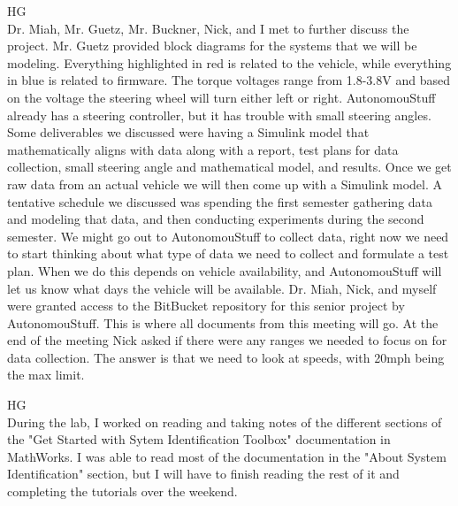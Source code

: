 \documentclass[fontsize=11pt, %
                             paper=letter, %
                             openany, %
                             captions=tableheading,
                             index=totoc,
                             hyperref]{labbook}
\def\currentYear{2021}
\begin{document}
\begin{addmargin}[0cm]{0cm}
\labday{Thursday, September 23, \currentYear}
HG\\

Dr. Miah, Mr. Guetz, Mr. Buckner, Nick, and I met to further discuss the project. Mr. Guetz provided block diagrams for the systems that we will be modeling. Everything highlighted in red is related to the vehicle, while everything in blue is related to firmware. The torque voltages range from 1.8-3.8V and based on the voltage the steering wheel will turn either left or right. AutonomouStuff already has a steering controller, but it has trouble with small steering angles. Some deliverables we discussed were having a Simulink model that mathematically aligns with data along with a report, test plans for data collection, small steering angle and mathematical model, and results. Once we get raw data from an actual vehicle we will then come up with a Simulink model. A tentative schedule we discussed was spending the first semester gathering data and modeling that data, and then conducting experiments during the second semester. We might go out to AutonomouStuff to collect data, right now we need to start thinking about what type of data we need to collect and formulate a test plan. When we do this depends on vehicle availability, and AutonomouStuff will let us know what days the vehicle will be available. Dr. Miah, Nick, and myself were granted access to the BitBucket repository for this senior project by AutonomouStuff. This is where all documents from this meeting will go. At the end of the meeting Nick asked if there were any ranges we needed to focus on for data collection. The answer is that we need to look at speeds, with 20mph being the max limit. 



HG\\
During the lab, I worked on reading and taking notes of the different sections of the "Get Started with Sytem Identification Toolbox" documentation in MathWorks. I was able to read most of the documentation in the "About System Identification" section, but I will have to finish reading the rest of it and completing the tutorials over the weekend. 

\vspace*{12pt}


\end{addmargin}
\end{document}
